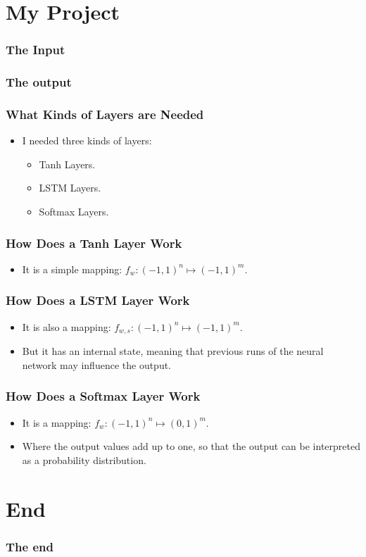 \documentclass[12]{beamer}
\begin{document}
\section{My Project}
\begin{frame}
\frametitle{The Input}
\end{frame}

\begin{frame}
\frametitle{The output}
\end{frame}

\begin{frame}
\frametitle{What Kinds of Layers are Needed}
\begin{itemize}
\item<1-> I needed three kinds of layers:
\begin{itemize}
\item<1-> Tanh Layers.
\item<1-> LSTM Layers.
\item<1-> Softmax Layers.
\end{itemize}
\end{itemize}
\end{frame}

\begin{frame}
\frametitle{How Does a Tanh Layer Work}
\begin{itemize}
\item<1-> It is a simple mapping: $f_w:\left(-1,1\right)^n\longmapsto\left(-1,1\right)^m$.
\end{itemize}
\end{frame}

\begin{frame}
\frametitle{How Does a LSTM Layer Work}
\begin{itemize}
\item<1-> It is also a mapping: $f_{w,s}:\left(-1,1\right)^n\longmapsto\left(-1,1\right)^m$.
\item<1-> But it has an internal state, meaning that previous runs of the neural network may influence the output.
\end{itemize}
\end{frame}

\begin{frame}
\frametitle{How Does a Softmax Layer Work}
\begin{itemize}
\item<1-> It is a mapping: $f_w:\left(-1,1\right)^n\longmapsto\left(0,1\right)^m$.
\item<1-> Where the output values add up to one, so that the output can be interpreted as a probability distribution.
\end{itemize}
\end{frame}

\section{End}
\begin{frame}
\frametitle{The end}
\end{frame}
\end{document}
